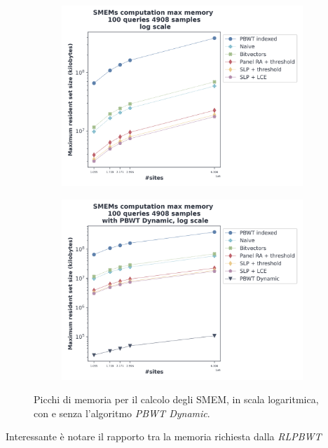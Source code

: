 \begin{figure}
  \centering
  \begin{subfigure}{.5\textwidth}
    \centering
    \includegraphics[width=\linewidth]{img/exe_mem_log.png}
  \end{subfigure}%
  \begin{subfigure}{.5\textwidth}
    \centering
    \includegraphics[width=\linewidth]{img/exe_mem_dyn_log.png}
  \end{subfigure}
  \caption{Picchi di memoria per il calcolo degli SMEM, in scala logaritmica,
    con e senza 
    l'algoritmo \textit{PBWT Dynamic}.}
  \label{fig:smemmemchr}
\end{figure}
Interessante è notare il rapporto tra la memoria richiesta dalla \textit{RLPBWT}
